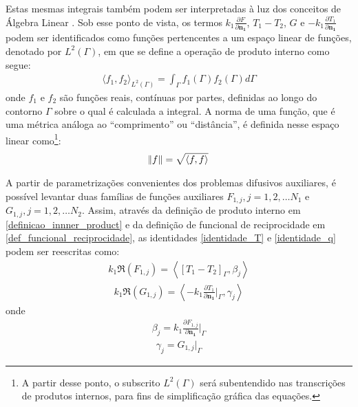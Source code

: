Estas mesmas integrais também podem ser interpretadas à luz dos conceitos de Álgebra Linear \citep{livro_axler}. Sob esse ponto de vista, os termos
$\displaystyle k_1 \frac{\partial F}{\partial\mathbf{n_1}}$, $T_1 - T_2$, $G$ e $\displaystyle-k_1 \frac{\partial T_1}{\partial\mathbf{n_1}}$ podem ser identificados como funções pertencentes a um espaço
linear de funções, denotado por $L^2(\Gamma)$, em que se define a operação de produto interno como segue:
\begin{align}
	\langle f_1, f_2\rangle_{L^2(\Gamma)} = \int_\Gamma f_1(\Gamma) f_2(\Gamma) d\Gamma \label{definicao_innner_product}
\end{align} 
onde $f_1$ e $f_2$ são funções reais, contínuas por partes, definidas ao longo do contorno $\Gamma$ sobre o qual é calculada a integral. A norma de uma
função, que é uma métrica análoga ao ``comprimento'' ou ``distância'', é definida nesse espaço linear como\footnote{A partir desse ponto, o subscrito ${L^2(\Gamma)}$ será
subentendido nas transcrições de produtos internos, para fins de simplificação gráfica das equações.}:
\begin{align}
	\norm{f} = \sqrt{\langle f, f\rangle}
\end{align}

A partir de parametrizações convenientes dos problemas difusivos auxiliares, é possível levantar duas famílias de funções auxiliares $F_{1,j}, j=1,2,\ldots N_1$
e $G_{1,j}, j=1,2,\ldots N_2$. Assim, através da definição de produto interno em \eqref{definicao_innner_product} e da definição de funcional de reciprocidade em \eqref{def_funcional_reciprocidade},
as identidades \eqref{identidade_T} e \eqref{identidade_q} podem ser reescritas como:
\begin{align}
	k_1 \Re(F_{1,j})
	=
	\left\langle \left[T_1 - T_2\right]_\Gamma, \beta_j\right\rangle
	\label{identidade_T_inner}
\end{align}
\begin{align}
	k_1 \Re(G_{1,j})
	=
	\left\langle  -k_1 \frac{\partial T_1}{\partial\mathbf{n_1}}\bigg|_\Gamma, \gamma_j\right\rangle
	\label{identidade_q_inner}
\end{align}
onde
\begin{align}
	\beta_j = k_1 \frac{\partial F_{1,j}}{\partial\mathbf{n_1}}\bigg|_\Gamma \label{expressao_define_beta}
\end{align}
\begin{align}
	\gamma_j = G_{1,j}\big|_\Gamma \label{expressao_define_gamma}
\end{align}

